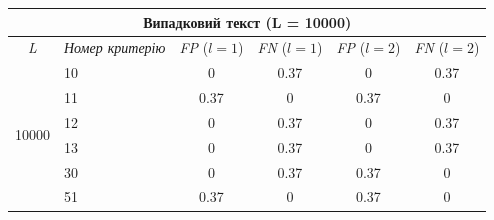 \documentclass[a4paper,12pt]{article}
\begin{document}
\begin{center}
\renewcommand{\arraystretch}{1.2}
\setlength{\tabcolsep}{6pt}
\begin{tabular}{|c|l||c|c||c|c|}
\hline
\multicolumn{6}{|c|}{Випадковий текст (L = 10000)} \\
\hline
\textit{L} & \textit{Номер критерію} & \textit{FP} ($l=1$) & \textit{FN} ($l=1$) & \textit{FP} ($l=2$) & \textit{FN} ($l=2$) \\
\hline
\multirow{6}{*}{10000} & 10 & 0 & 0.37 & 0 & 0.37 \\
 & 11 & 0.37 & 0 & 0.37 & 0 \\
 & 12 & 0 & 0.37 & 0 & 0.37 \\
 & 13 & 0 & 0.37 & 0 & 0.37 \\
 & 30 & 0 & 0.37 & 0.37 & 0 \\
 & 51 & 0.37 & 0 & 0.37 & 0 \\
\hline
\end{tabular}
\end{center}
\end{document}
